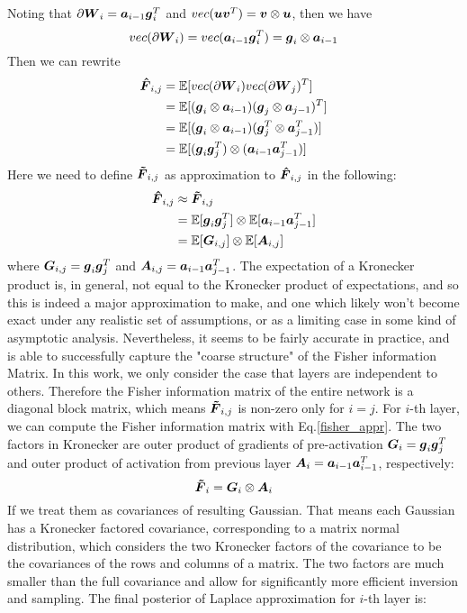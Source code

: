 Noting that $\partial \boldsymbol W_i = \boldsymbol a_{i-1}\boldsymbol g_i^T$ and $vec(\boldsymbol u \boldsymbol v^T) = \boldsymbol v \otimes \boldsymbol u$, then we have 
\[
vec(\partial \boldsymbol W_i) = vec(\boldsymbol a_{i-1}\boldsymbol g_{i}^T) = \boldsymbol g_i \otimes \boldsymbol a_{i-1}
\]
Then we can rewrite 
\[
\begin{aligned}
\boldsymbol{\hat F}_{i,j} &=  \mathbb E[vec(\partial\boldsymbol W_i)vec(\partial\boldsymbol W_j)^T]\\
&=\mathbb E[(\boldsymbol g_i \otimes \boldsymbol a_{i-1})(\boldsymbol g_j \otimes \boldsymbol a_{j-1})^T]\\
&=\mathbb E[(\boldsymbol g_i \otimes \boldsymbol a_{i-1})(\boldsymbol g_j^T \otimes \boldsymbol a_{j-1}^T)]\\
&=\mathbb E[(\boldsymbol g_i \boldsymbol g_j^T)\otimes(\boldsymbol a_{i-1}  \boldsymbol a_{j-1}^T)]
\end{aligned}
\]
Here we need to define $\boldsymbol{\tilde{F}}_{i,j}$ as approximation to $\boldsymbol{\hat F}_{i,j}$ in the following:
\begin{equation}
\begin{aligned}\label{fisher_appr}
\boldsymbol{\hat F}_{i,j} &\approx \boldsymbol{\tilde{F}}_{i,j} \\
&=\mathbb E[\boldsymbol g_i \boldsymbol g_j^T] \otimes \mathbb E[\boldsymbol a_{i-1} \boldsymbol a_{j-1}^T] \\
&= \mathbb E[\boldsymbol G_{i,j}] \otimes \mathbb E[\boldsymbol A_{i,j}]
\end{aligned}
\end{equation}
where $\boldsymbol G_{i,j} = \boldsymbol g_i \boldsymbol g_j^T$ and $\boldsymbol A_{i,j} = \boldsymbol a_{i-1}\boldsymbol a_{j-1}^T$. The expectation of a Kronecker product is, in general, not equal to the Kronecker product of expectations, and so this
is indeed a major approximation to make, and one which likely won't become exact under any realistic set of assumptions, or as a limiting case in some kind of asymptotic analysis. Nevertheless, it seems to be fairly accurate in practice, and is able to successfully capture the "coarse structure" of the Fisher information Matrix. 
In this work, we only consider the case that layers are independent to others. Therefore the Fisher information matrix of the entire network is a diagonal block matrix, which means $\boldsymbol{\tilde{F}}_{i,j}$ is non-zero only for $i=j$. For $i$-th layer, we can compute the Fisher information matrix with Eq.\ref{fisher_appr}. The two factors in Kronecker are outer product of gradients of pre-activation $\boldsymbol G_i = \boldsymbol g_i \boldsymbol g_j^T$ and outer product of activation from previous layer $\boldsymbol A_{i} = \boldsymbol a_{i-1}\boldsymbol a_{i-1}^T$, respectively:
\[
\boldsymbol{\tilde{F}}_{i} = \boldsymbol G_i \otimes \boldsymbol A_i
\] 
If we treat them as covariances of resulting Gaussian. That means each Gaussian has a Kronecker factored covariance, corresponding to a matrix normal distribution\cite{gupta1999matrix}, which considers the two Kronecker factors of the covariance to be the covariances of the rows and columns of a matrix. The two factors are much smaller than the full covariance and allow for significantly more efficient inversion and sampling. The final posterior of Laplace approximation for $i$-th layer is:
